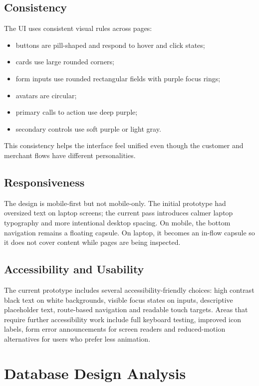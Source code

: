 \documentclass[12pt,a4paper]{article}
\begin{document}
\subsection{Consistency}
The UI uses consistent visual rules across pages:
\begin{itemize}
    \item buttons are pill-shaped and respond to hover and click states;
    \item cards use large rounded corners;
    \item form inputs use rounded rectangular fields with purple focus rings;
    \item avatars are circular;
    \item primary calls to action use deep purple;
    \item secondary controls use soft purple or light gray.
\end{itemize}

This consistency helps the interface feel unified even though the customer and merchant flows have different personalities.

\subsection{Responsiveness}
The design is mobile-first but not mobile-only. The initial prototype had oversized text on laptop screens; the current pass introduces calmer laptop typography and more intentional desktop spacing. On mobile, the bottom navigation remains a floating capsule. On laptop, it becomes an in-flow capsule so it does not cover content while pages are being inspected.

\subsection{Accessibility and Usability}
The current prototype includes several accessibility-friendly choices: high contrast black text on white backgrounds, visible focus states on inputs, descriptive placeholder text, route-based navigation and readable touch targets. Areas that require further accessibility work include full keyboard testing, improved icon labels, form error announcements for screen readers and reduced-motion alternatives for users who prefer less animation.

\section{Database Design Analysis}
\end{document}
